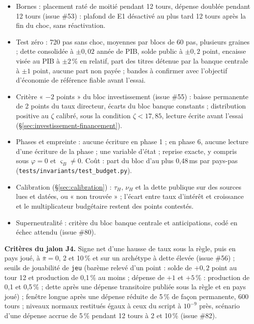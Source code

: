 \documentclass[11pt,a4paper]{article}
\begin{document}
\begin{proposee}
\begin{itemize}
\item Bornes : placement raté de moitié pendant 12 tours, dépense doublée pendant 12 tours (issue \#53) : plafond de E1 désactivé au plus tard 12 tours après la fin du choc, sans réactivation.
\item Test zéro : 720 pas sans choc, moyennes par blocs de 60 pas, plusieurs graines ; dette consolidée à $\pm 0{,}02$ année de PIB, solde public à $\pm 0{,}2$ point, encaisse visée au PIB à $\pm 2\,\%$ en relatif, part des titres détenue par la banque centrale à $\pm 1$ point, aucune part non payée ; bandes à confirmer avec l'objectif d'économie de référence fiable avant l'essai.
\item Critère « $-2$ points » du bloc investissement (issue \#55) : baisse permanente de 2 points du taux directeur, écarts du bloc banque constants ; distribution positive au $\zeta$ calibré, sous la condition $\zeta < 17{,}85$, lecture écrite avant l'essai (\S\ref{sec:investissement-financement}).
\item Phases et empreinte : aucune écriture en phase 1 ; en phase 6, aucune lecture d'une écriture de la phase ; une variable d'état ; reprise exacte, y compris sous $\varphi = 0$ et $\varsigma_B \ne 0$. Coût : part du bloc d'au plus 0,48\,ms par pays-pas (\nolinkurl{tests/invariants/test_budget.py}).
\item Calibration (\S\ref{sec:calibration}) : $\tau_H$, $\nu_H$ et la dette publique sur des sources lues et datées, ou « non trouvée » ; l'écart entre taux d'intérêt et croissance et le multiplicateur budgétaire restent des points contestés.
\item Superneutralité : critère du bloc banque centrale et anticipations, codé en échec attendu (issue \#80).
\end{itemize}

\textbf{Critères du jalon J4.} Signe net d'une hausse de taux sous la règle, puis en pays joué, à $\bar\pi = 0$, 2 et 10\,\% et sur un archétype à dette élevée (issue \#56) ; seuils de jouabilité de \texttt{jeu} (barème relevé d'un point : solde de $+0{,}2$ point au tour 12 et production de 0,1\,\% au moins ; dépense de $+1$ et $+5\,\%$ : production de 0,1 et 0,5\,\% ; dette après une dépense transitoire publiée sous la règle et en pays joué) ; fenêtre longue après une dépense réduite de 5\,\% de façon permanente, 600 tours ; niveaux normaux restitués égaux à ceux du script à $10^{-9}$ près, scénario d'une dépense accrue de 5\,\% pendant 12 tours à 2 et 10\,\% (issue \#82).


\end{proposee}
\end{document}
